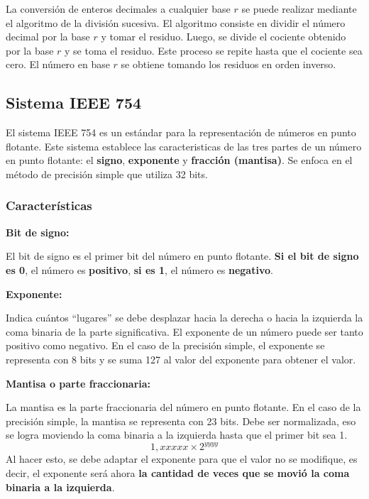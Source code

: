 \begin{mdframed}[backgroundcolor=gray!10,linewidth=0]
    La conversión de enteros decimales a cualquier base $r$ se puede realizar mediante el algoritmo de la división sucesiva. El algoritmo consiste en dividir el número decimal por la base $r$ y tomar el residuo. Luego, se divide el cociente obtenido por la base $r$ y se toma el residuo. Este proceso se repite hasta que el cociente sea cero. El número en base $r$ se obtiene tomando los residuos en orden inverso.
\end{mdframed}

\subsection{Sistema IEEE 754}
El sistema IEEE 754 es un estándar para la representación de números en punto flotante. Este sistema establece las caracteristicas de las tres partes de un número en punto flotante: el \textbf{signo}, \textbf{exponente} y \textbf{fracción (mantisa)}. Se enfoca en el método de precisión simple que utiliza 32 bits.

\subsubsection{Características}
\begin{center} \textbf{Bit de signo:} \end{center}
El bit de signo es el primer bit del número en punto flotante. \textbf{Si el bit de signo es 0}, el número es \textbf{positivo}, \textbf{si es 1}, el número es \textbf{negativo}.    
\begin{center} \textbf{Exponente:} \end{center}
Indica cuántos “lugares” se debe desplazar hacia la derecha o hacia la izquierda la coma binaria de la parte significativa. El exponente de un número puede ser tanto positivo como negativo. En el caso de la precisión simple, el exponente se representa con 8 bits y se suma 127 al valor del exponente para obtener el valor.
\begin{center} \textbf{Mantisa o parte fraccionaria:} \end{center}
La mantisa es la parte fraccionaria del número en punto flotante. En el caso de la precisión simple, la mantisa se representa con 23 bits. Debe ser normalizada, eso se logra moviendo la coma binaria a la izquierda hasta que el primer bit sea 1.
\begin{equation*}
    1,xxxxx \times 2^{yyyy}
\end{equation*}
Al hacer esto, se debe adaptar el exponente para que el valor no se modifique, es decir, el exponente será ahora \textbf{la cantidad de veces que se movió la coma binaria a la izquierda}.

